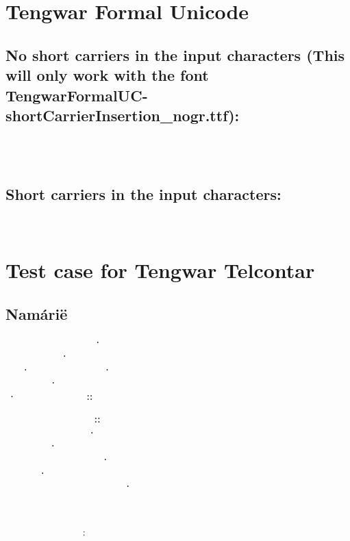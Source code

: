 \documentclass[11pt,a4paper]{article}
\begin{document}
\section*{Tengwar Formal Unicode}

\subsection*{No short carriers in the input characters (This will only work with the font TengwarFormalUC-shortCarrierInsertion\_nogr.ttf):}

\formal
                    

\subsection*{Short carriers in the input characters:}

\formal
   

\section*{Test case for Tengwar Telcontar}

\subsection*{Namárië}
\formal
     ⸱  \\
   ⸱     \\
⸱   ⸱  \\
  ⸱     \\
⸱  ⸬

      ⸬ \\
    ⸱   \\
 ⸱     \\
    ⸱ \\
  ⸱      \\
      ⸱

   

    :
\end{document}
